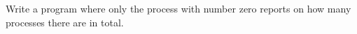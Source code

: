   \label{ex:hello4}
  Write a program where only the process with number zero
  reports on how many processes there are in total.

